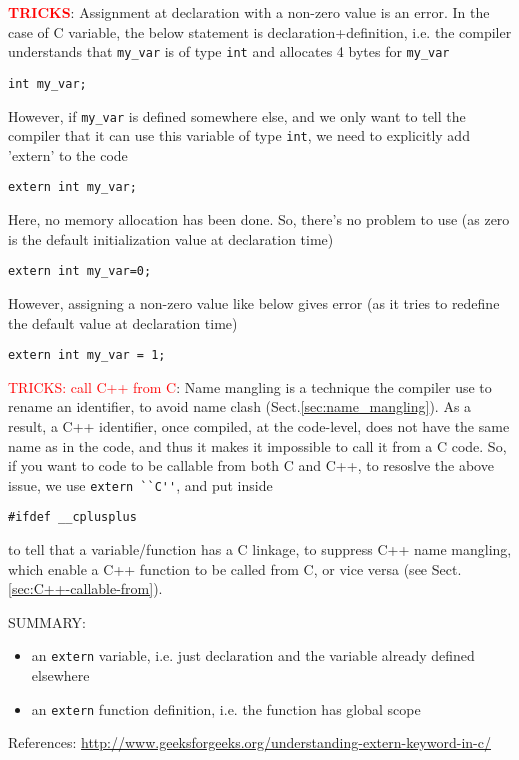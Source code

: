 \textcolor{red}{\bf TRICKS}: Assignment at declaration with a non-zero value is
an error. In the case of C variable, the below statement is
declaration+definition, i.e.
the compiler understands that \verb!my_var! is of type \verb!int! and allocates
4 bytes for \verb!my_var!
\begin{lstlisting}
int my_var;
\end{lstlisting} 
However, if \verb!my_var! is defined somewhere else, and we only want to tell
the compiler that it can use this variable of type \verb!int!, we need to
explicitly add 'extern' to the code
\begin{lstlisting}
extern int my_var;
\end{lstlisting}
Here, no memory allocation has been done. So, there's no problem to use (as
zero is the default initialization value at declaration time)
\begin{verbatim}
extern int my_var=0;
\end{verbatim}
However, assigning a non-zero value like below gives error (as it tries to
redefine the default value at declaration time)
\begin{verbatim}
extern int my_var = 1;
\end{verbatim}

\textcolor{red}{TRICKS: call C++ from C}: Name mangling is a technique the
compiler use to rename an identifier, to avoid name clash
(Sect.\ref{sec:name_mangling}). As a result, a C++ identifier, once compiled, at
the code-level, does not have the same name as in the code, and thus it makes it
impossible to call it from a C code. So, if you want to code to be callable
from both C and C++, to resoslve the above issue, we use \verb!extern ``C''!,
and put inside
\begin{verbatim}
#ifdef __cplusplus 
\end{verbatim}
to tell that a variable/function has a C linkage, to suppress C++
name mangling, which enable a C++ function to be called from C, or vice versa
(see Sect.\ref{sec:C++-callable-from}).

SUMMARY: 
\begin{itemize}
  \item an \verb!extern! variable, i.e. just declaration and the variable
  already defined elsewhere
  \item an \verb!extern! function definition, i.e. the function has global scope
\end{itemize}

References:
\url{http://www.geeksforgeeks.org/understanding-extern-keyword-in-c/}

